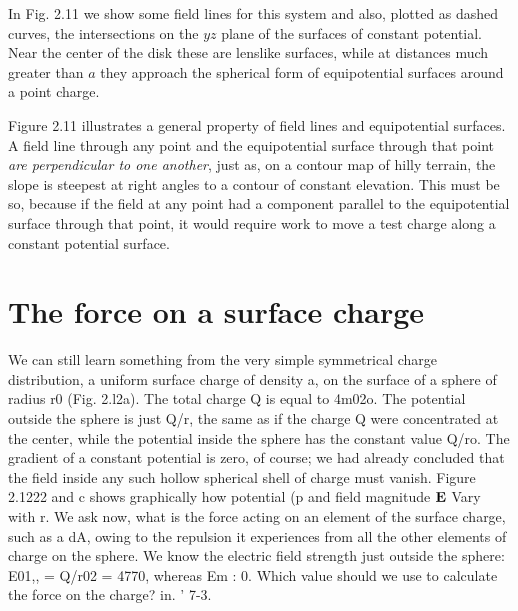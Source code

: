 In Fig. 2.11 we show some field lines for this system and also,
plotted as dashed curves, the intersections on the $yz$ plane of the surfaces
of constant potential. Near the center of the disk these are
lenslike surfaces, while at distances much greater than $a$ they 
approach the spherical form of equipotential surfaces around a point
charge.

Figure 2.11 illustrates a general property of field lines and 
equipotential surfaces. A field line through any point and the equipotential
surface through that point \emph{are perpendicular to one another}, just as,
on a contour map of hilly terrain, the slope is steepest at right angles
to a contour of constant elevation. This must be so, because if the
field at any point had a component parallel to the equipotential surface
through that point, it would require work to move a test charge
along a constant potential surface.



\iffalse

\section{The force on a surface charge}

We can still learn something from the very simple symmetrical
charge distribution, a uniform surface charge of density a, on the
surface of a sphere of radius r0 (Fig. 2.l2a). The total charge Q is
equal to 4m02o. The potential outside the sphere is just Q/r, the
same as if the charge Q were concentrated at the center, while the
potential inside the sphere has the constant value Q/ro. The gradient
of a constant potential is zero, of course; we had already concluded
that the field inside any such hollow spherical shell of charge must
vanish. Figure 2.1222 and c shows graphically how potential (p and
field magnitude $\mathbf{E}$ Vary with r. We ask now, what is the force acting
on an element of the surface charge, such as a dA, owing to the repulsion
it experiences from all the other elements of charge on the
sphere. We know the electric field strength just outside the sphere:
E01,, = Q/r02 = 4770, whereas Em : 0. Which value should we use
to calculate the force on the charge? in. ' 7-3.

